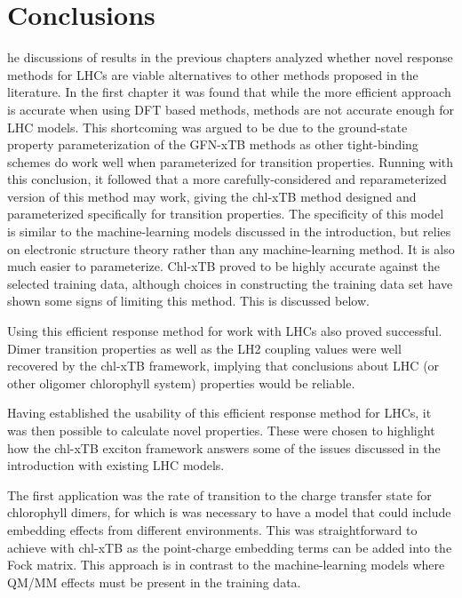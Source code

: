 %
%
\let\textcircled=\pgftextcircled
\chapter{Conclusions}
\label{chap:discussion}

he discussions of results in the previous chapters analyzed whether novel
response methods for LHCs are viable alternatives to other methods proposed in the
literature. In the first chapter it was found that while the more efficient \dscf 
approach is accurate when using DFT based methods, \dxtb methods are not accurate 
enough for LHC models. This shortcoming was argued to be due to the ground-state
property parameterization of the GFN-xTB methods as other tight-binding schemes 
do work well when parameterized for transition properties. Running with this conclusion, 
it followed that a more carefully-considered and reparameterized version of this
method may work, giving the chl-xTB method designed and parameterized specifically
for \Qy transition properties. The specificity of this model is similar to the machine-learning
models discussed in the introduction, but relies on electronic structure theory
rather than any machine-learning method. It is also much easier to parameterize. 
Chl-xTB proved to be highly accurate against the selected training data, although 
choices in constructing the training data set have shown some signs of limiting this
method. This is discussed below. 

Using this efficient response method for work with LHCs also proved successful. 
Dimer transition properties as well as the LH2 coupling values were well recovered 
by the chl-xTB framework, implying that conclusions about LHC (or other oligomer
chlorophyll system) properties would be reliable.

Having established the usability of this efficient response method for LHCs, it
was then possible to calculate novel properties. These were chosen to highlight 
how the chl-xTB exciton framework answers some of the issues discussed in the introduction
with existing LHC models. 

The first application was the rate of transition to the charge transfer state for
chlorophyll dimers, for which is was necessary to have a model that could include 
embedding effects from different environments. This was straightforward to achieve 
with chl-xTB as the point-charge embedding terms can be added into the Fock matrix. 
This approach is in contrast to the machine-learning models where QM/MM effects 
must be present in the training data. 

